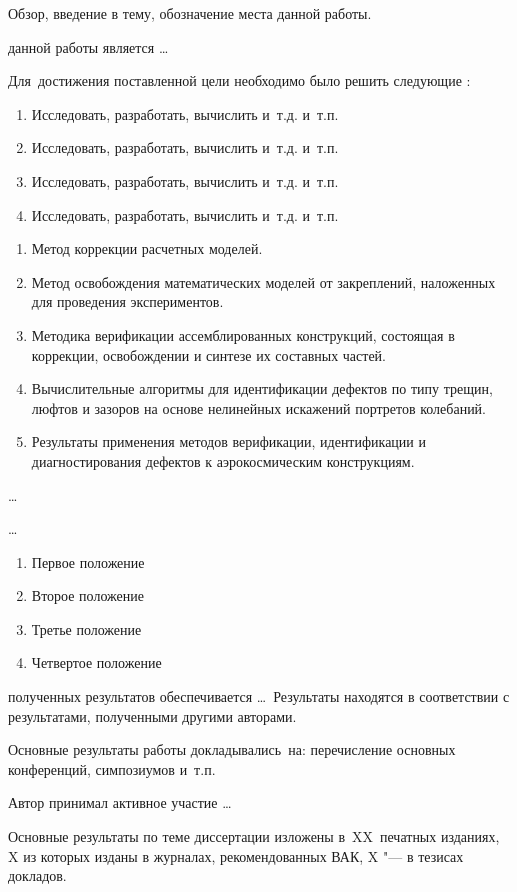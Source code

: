 
{\actuality} Обзор, введение в тему, обозначение места данной работы.

{\aim} данной работы является \ldots

Для~достижения поставленной цели необходимо было решить следующие {\tasks}:
\begin{enumerate}[beginpenalty = 10000] 
	\item Исследовать, разработать, вычислить и~т.\:д. и~т.\:п.
	\item Исследовать, разработать, вычислить и~т.\:д. и~т.\:п.
	\item Исследовать, разработать, вычислить и~т.\:д. и~т.\:п.
	\item Исследовать, разработать, вычислить и~т.\:д. и~т.\:п.
\end{enumerate}


{\novelty}
\begin{enumerate}[beginpenalty = 10000] 
	\item Метод коррекции расчетных моделей.
	\item Метод освобождения математических моделей от закреплений, наложенных для проведения экспериментов.
	\item Методика верификации ассемблированных конструкций, состоящая в коррекции, освобождении и синтезе их составных частей.
	\item Вычислительные алгоритмы для идентификации дефектов по типу трещин, люфтов и зазоров на основе нелинейных искажений портретов колебаний.
	\item Результаты применения методов верификации, идентификации и диагностирования дефектов к аэрокосмическим конструкциям.
\end{enumerate}

{\influence} \ldots

{\methods} \ldots

{}
\begin{enumerate}[beginpenalty = 10000] 
	\item Первое положение
	\item Второе положение
	\item Третье положение
	\item Четвертое положение
\end{enumerate}

{\reliability} полученных результатов обеспечивается \ldots \ Результаты находятся в соответствии с результатами, полученными другими авторами.


{\probation}
Основные результаты работы докладывались~на:
перечисление основных конференций, симпозиумов и~т.\:п.

{\contribution} Автор принимал активное участие \ldots

{\publications} Основные результаты по теме диссертации изложены
в~XX~печатных изданиях,
X из которых изданы в журналах, рекомендованных ВАК,
X "--- в тезисах докладов.
